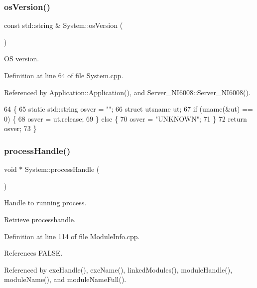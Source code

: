 \subsubsection{\texorpdfstring{os\+Version()}{osVersion()}}
{\footnotesize\ttfamily const std\+::string \& System\+::os\+Version (\begin{DoxyParamCaption}{ }\end{DoxyParamCaption})}



OS version. 



Definition at line 64 of file System.\+cpp.



Referenced by Application\+::\+Application(), and Server\+\_\+\+N\+I6008\+::\+Server\+\_\+\+N\+I6008().


\begin{DoxyCode}
64                                    \{
65   \textcolor{keyword}{static} std::string osver = \textcolor{stringliteral}{""};
66   \textcolor{keyword}{struct }utsname ut;
67   \textcolor{keywordflow}{if} (uname(&ut) == 0) \{
68     osver = ut.release;
69   \} \textcolor{keywordflow}{else} \{
70     osver = \textcolor{stringliteral}{"UNKNOWN"};
71   \}
72   \textcolor{keywordflow}{return} osver;
73 \}
\end{DoxyCode}
\mbox{\label{namespaceSystem_a563f947d4a2921f4348ff4f8e909a9f2}} 
\subsubsection{\texorpdfstring{process\+Handle()}{processHandle()}}
{\footnotesize\ttfamily void $\ast$ System\+::process\+Handle (\begin{DoxyParamCaption}{ }\end{DoxyParamCaption})}



Handle to running process. 

Retrieve processhandle. 

Definition at line 114 of file Module\+Info.\+cpp.



References F\+A\+L\+SE.



Referenced by exe\+Handle(), exe\+Name(), linked\+Modules(), module\+Handle(), module\+Name(), and module\+Name\+Full().


